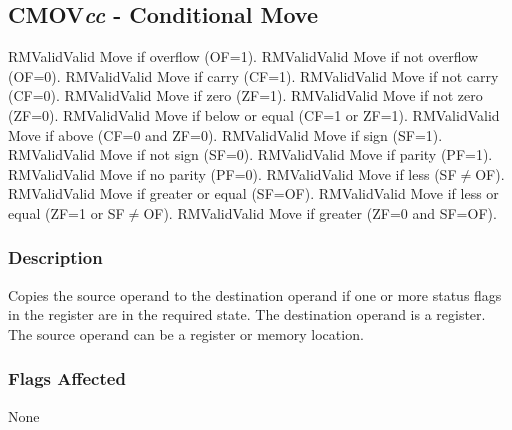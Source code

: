 \clearpage
{}
{}
\subsection*{CMOV\emph{cc} - Conditional Move}

\begin{x86opcodetable}
  {RM}{Valid}{Valid}
  {Move if overflow (OF=1).}
  {RM}{Valid}{Valid}
  {Move if not overflow (OF=0).}
  {RM}{Valid}{Valid}
  {Move if carry (CF=1).}
  {RM}{Valid}{Valid}
  {Move if not carry (CF=0).}
  {RM}{Valid}{Valid}
  {Move if zero (ZF=1).}
  {RM}{Valid}{Valid}
  {Move if not zero (ZF=0).}
  {RM}{Valid}{Valid}
  {Move if below or equal (CF=1 or ZF=1).}
  {RM}{Valid}{Valid}
  {Move if above (CF=0 and ZF=0).}
  {RM}{Valid}{Valid}
  {Move if sign (SF=1).}
  {RM}{Valid}{Valid}
  {Move if not sign (SF=0).}
  {RM}{Valid}{Valid}
  {Move if parity (PF=1).}
  {RM}{Valid}{Valid}
  {Move if no parity (PF=0).}
  {RM}{Valid}{Valid}
  {Move if less (SF$\neq{}$OF).}
  {RM}{Valid}{Valid}
  {Move if greater or equal (SF=OF).}
  {RM}{Valid}{Valid}
  {Move if less or equal (ZF=1 or SF$\neq{}$OF).}
  {RM}{Valid}{Valid}
  {Move if greater (ZF=0 and SF=OF).}
\end{x86opcodetable}

\begin{x86opentable}
\end{x86opentable}

\subsubsection*{Description}

Copies the source operand to the destination operand if one or more
status flags in the \RFLAGS{} register are in the required state. The
destination operand is a register.  The source operand can be a
register or memory location.

\subsubsection*{Flags Affected}

None
